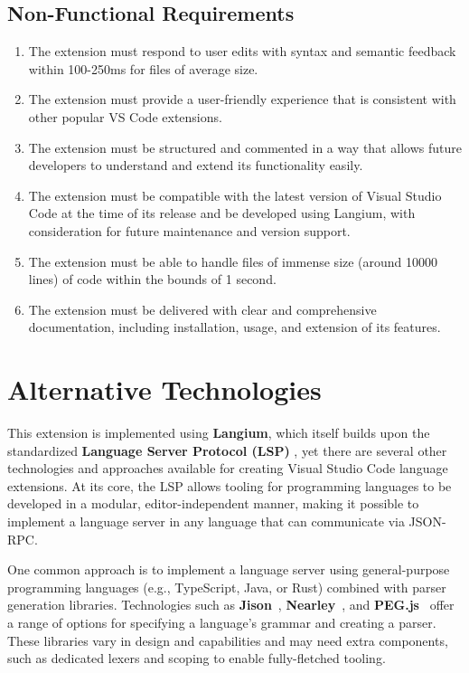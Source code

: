 \begin{multicols}{2}
  \subsection*{Non-Functional Requirements}
  \begin{enumerate}
    \item The extension must respond to user edits with syntax and semantic feedback within 100-250ms for files of average size.
    \item The extension must provide a user-friendly experience that is consistent with other popular VS Code extensions.
    \item The extension must be structured and commented in a way that allows future developers to understand and extend its functionality easily.
    \item The extension must be compatible with the latest version of Visual Studio Code at the time of its release and be developed using Langium, with consideration for future maintenance and version support.
    \item The extension must be able to handle files of immense size (around 10000 lines) of code within the bounds of 1 second.
    \item The extension must be delivered with clear and comprehensive documentation, including installation, usage, and extension of its features.
  \end{enumerate}
\end{multicols}

\section{Alternative Technologies}

This extension is implemented using \textbf{Langium}, which itself builds upon the standardized \textbf{Language Server Protocol (LSP)} \cite{LSP}, yet
there are several other technologies and approaches available for creating Visual Studio Code language extensions. At its core, the LSP allows tooling for programming
languages to be developed in a modular, editor-independent manner, making it possible to implement a language server in any language that can communicate via JSON-RPC.

One common approach is to implement a language server using general-purpose programming languages (e.g., TypeScript, Java, or Rust) combined with parser generation libraries.
Technologies such as \textbf{Jison}~\cite{Jison}, \textbf{Nearley}~\cite{Nearley}, and \textbf{PEG.js}~\cite{PEGjs} offer a range of options for specifying a language's grammar
and creating a parser. These libraries vary in design and capabilities and may need extra components, such as dedicated lexers and scoping to enable fully-fletched tooling.

